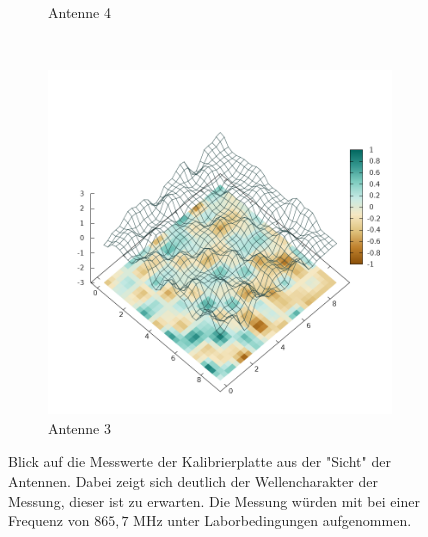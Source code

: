\begin{figure}[ht!]
\begin{subfigure}[b]{0.4\textwidth}
			\caption[Loren ipsum]{Antenne 4}
			\label{fig:Plate0_A3}
        \end{subfigure}
\\
        \begin{subfigure}[b]{0.4\textwidth}
			\centering
			\includegraphics[width=\textwidth]{img/Plate0_A3.png}
			\caption[Loren ipsum]{Antenne 3}
			\label{fig:Plate0_A4}
        \end{subfigure}
        \caption[Reale Messwerte visualisiert]{Blick auf die Messwerte der  Kalibrierplatte aus der "Sicht" der Antennen. Dabei zeigt sich deutlich der Wellencharakter der Messung, dieser ist zu erwarten. Die Messung würden mit bei einer Frequenz von $865,7$ MHz unter Laborbedingungen aufgenommen. }\label{fig:Real_Measurements}
\end{figure}
%
